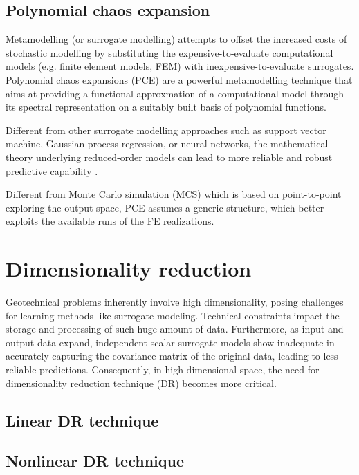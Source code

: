 \subsection{Polynomial chaos expansion}
Metamodelling (or surrogate modelling) attempts to offset the increased costs of stochastic modelling by substituting the expensive-to-evaluate computational models (e.g. finite element models, FEM) with inexpensive-to-evaluate surrogates.
Polynomial chaos expansions (PCE) are a powerful metamodelling technique that aims at providing a functional approxmation of a computational model through its spectral representation on a suitably built basis of polynomial functions.

Different from other surrogate modelling approaches such as support vector machine, Gaussian process regression, or neural networks, the mathematical theory underlying reduced-order models can lead to more reliable and robust predictive capability \citep{frangos2010,kapteyn2021}.

Different from Monte Carlo simulation (MCS) which is based on point-to-point exploring the output space, PCE assumes a generic structure, which better exploits the available runs of the FE realizations.



\section{Dimensionality reduction}


Geotechnical problems inherently involve high dimensionality, posing challenges for learning methods like surrogate modeling. Technical constraints impact the storage and processing of such huge amount of data. Furthermore, as input and output data expand, independent scalar surrogate models show inadequate in accurately capturing the covariance matrix of the original data, leading to less reliable predictions. Consequently, in high dimensional space, the need for dimensionality reduction technique (DR) becomes more critical. 


\subsection{Linear DR technique}

\subsection{Nonlinear DR technique}

